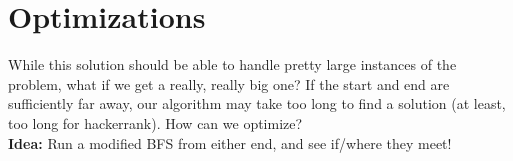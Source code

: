 \documentclass[11pt]{exam}
\begin{document}
\section*{Optimizations}
While this solution should be able to handle pretty large instances of the problem, what if we get a really, really big one? If the start and end are sufficiently far away, our algorithm may take too long to find a solution (at least, too long for hackerrank). How can we optimize?\\
\textbf{Idea:} Run a modified BFS from either end, and see if/where they meet!
\end{document}
